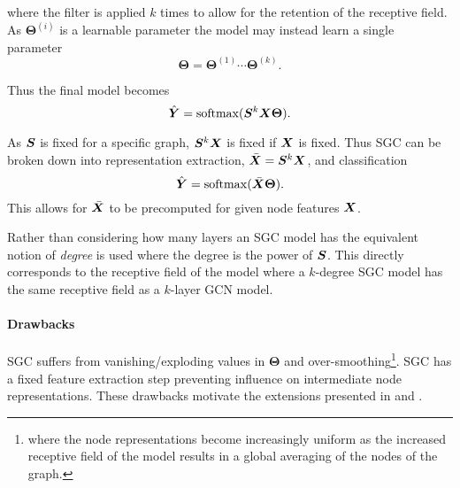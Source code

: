 where the filter is applied $k$ times to allow for the retention of the receptive field.
As $\bm{\Theta}^{(i)}$ is a learnable parameter the model may instead learn a single parameter
\begin{equation}
    \label{eq:theta}
    \bm{\Theta} = \bm{\Theta}^{(1)}\cdots\bm{\Theta}^{(k)}.
\end{equation}

Thus the final model becomes
\begin{equation}
    \hat{{\bm{Y}}} = \operatorname{softmax}({\bm{S}}^{k}{\bm{X}}\bm{\Theta}).
\end{equation}

As ${\bm{S}}$ is fixed for a specific graph, ${\bm{S}}^k{\bm{X}}$ is fixed if ${\bm{X}}$ is fixed.
Thus SGC can be broken down into representation extraction, $\bar{{\bm{X}}} = {\bm{S}}^k{\bm{X}}$, and classification
\begin{equation}
    \label{eq:SGC}
    \hat{{\bm{Y}}} = \operatorname{softmax}(\bar{{\bm{X}}}\bm{\Theta}).
\end{equation}
This allows for $\bar{{\bm{X}}}$ to be precomputed for given node features ${\bm{X}}$.

Rather than considering how many layers an SGC model has the equivalent notion of \emph{degree} is used where the degree is the power of ${\bm{S}}$.
This directly corresponds to the receptive field of the model where a $k$-degree SGC model has the same receptive field as a $k$-layer GCN model.

\paragraph{Drawbacks}
SGC suffers from vanishing/exploding values in $\bm{\Theta}$ and over-smoothing\footnote{where the node representations become increasingly uniform as the increased receptive field of the model results in a global averaging of the nodes of the graph.}.
SGC has a fixed feature extraction step preventing influence on intermediate node representations.
These drawbacks motivate the extensions presented in  and .


